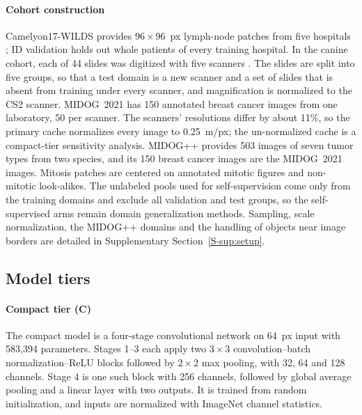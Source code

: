 \paragraph{Cohort construction} Camelyon17-WILDS provides $96\times96$~px
lymph-node patches from five hospitals \citep{koh2021wilds,bandi2019camelyon17};
ID validation holds out whole patients of every training hospital. In the
canine cohort, each of 44 slides was digitized with five scanners
\citep{wilm2023canine}. The slides are split into five groups, so that a test
domain is a new scanner and a set of slides that is absent from training under
every scanner, and magnification is normalized to the CS2 scanner. MIDOG~2021
\citep{aubreville2023midog} has 150 annotated breast cancer images from one
laboratory, 50 per scanner. The scanners' resolutions differ by about 11\%, so
the primary cache normalizes every image to 0.25~\textmu m/px; the
un-normalized cache is a compact-tier sensitivity analysis. MIDOG++
\citep{aubreville2023midogpp} provides 503 images of seven tumor types from two
species, and its 150 breast cancer images are the MIDOG~2021 images. Mitosis
patches are centered on annotated mitotic figures and non-mitotic look-alikes.
The unlabeled pools used for self-supervision come only from the training
domains and exclude all validation and test groups, so the self-supervised arms
remain domain generalization methods. Sampling, scale normalization, the
MIDOG++ domains and the handling of objects near image borders are detailed in
Supplementary Section~\ref{S-sup:setup}.

\subsection{Model tiers}
\label{sec:setup-models}

\paragraph{Compact tier (C)} The compact model is a four-stage convolutional
network on 64~px input with 583,394 parameters. Stages 1--3 each apply two
$3\times3$ convolution--batch normalization--ReLU blocks followed by $2\times2$
max pooling, with 32, 64 and 128 channels. Stage 4 is one such block with 256
channels, followed by global average pooling and a linear layer with two
outputs. It is trained from random initialization, and inputs are normalized
with ImageNet channel statistics.

